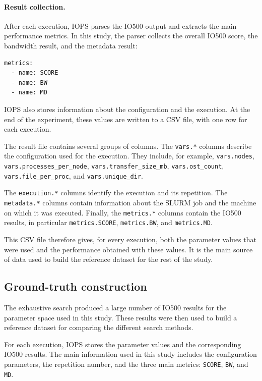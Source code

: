 \paragraph{Result collection.}

After each execution, IOPS parses the IO500 output and extracts the main
performance metrics. In this study, the parser collects the overall
IO500 score, the bandwidth result, and the metadata result:

\begin{verbatim}
metrics:
  - name: SCORE
  - name: BW
  - name: MD
\end{verbatim}

IOPS also stores information about the configuration and the execution.
At the end of the experiment, these values are written to a CSV file,
with one row for each execution.

The result file contains several groups of columns. The
\texttt{vars.*} columns describe the configuration used for the
execution. They include, for example,
\texttt{vars.nodes},
\texttt{vars.processes\_per\_node},
\texttt{vars.transfer\_size\_mb},
\texttt{vars.ost\_count},
\texttt{vars.file\_per\_proc}, and
\texttt{vars.unique\_dir}.

The \texttt{execution.*} columns identify the execution and its
repetition. The \texttt{metadata.*} columns contain information about
the SLURM job and the machine on which it was executed. Finally, the
\texttt{metrics.*} columns contain the IO500 results, in particular
\texttt{metrics.SCORE}, \texttt{metrics.BW}, and
\texttt{metrics.MD}.

This CSV file therefore gives, for every execution, both the parameter
values that were used and the performance obtained with these values.
It is the main source of data used to build the reference dataset for the
rest of the study.

\subsection{Ground-truth construction}
\label{sec:ground-truth}

The exhaustive search produced a large number of IO500 results for the
parameter space used in this study. These results were then used to build
a reference dataset for comparing the different search methods.

For each execution, IOPS stores the parameter values and the corresponding
IO500 results. The main information used in this study includes the
configuration parameters, the repetition number, and the three main
metrics: \texttt{SCORE}, \texttt{BW}, and \texttt{MD}.

